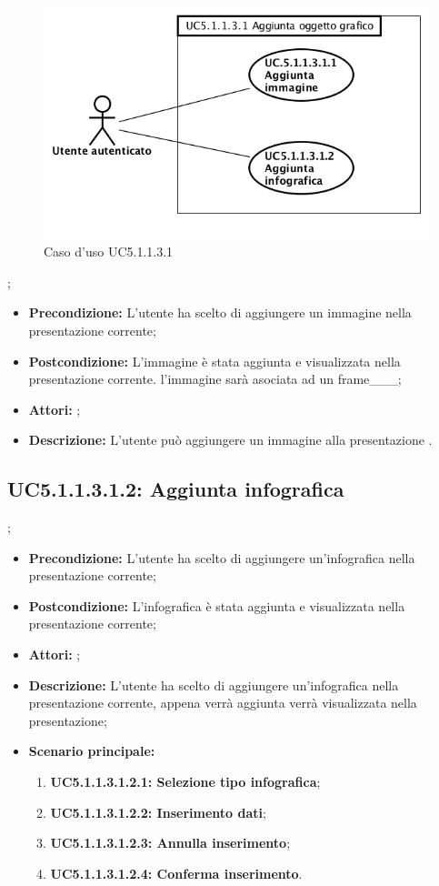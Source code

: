\begin{figure}[h]
	\begin{center}
	\includegraphics[scale=0.4]{diagram/UC5-1-1-3-1.png}
	\caption{Caso d'uso UC5.1.1.3.1}
	\end{center}
\end{figure};
\begin{itemize}
	\item \textbf{Precondizione:} L'utente ha scelto di aggiungere un immagine nella presentazione corrente;
	\item \textbf{Postcondizione:} L'immagine è stata aggiunta e visualizzata nella presentazione corrente. l'immagine sarà asociata ad un frame___;
	\item \textbf{Attori:} ;
	\item \textbf{Descrizione:} L'utente può aggiungere un immagine alla presentazione .
\end{itemize}
\subsection{ UC5.1.1.3.1.2: Aggiunta infografica}
;
\begin{itemize}
	\item \textbf{Precondizione:} L'utente ha scelto di aggiungere un'infografica  nella presentazione corrente;
	\item \textbf{Postcondizione:} L'infografica è stata aggiunta e visualizzata nella presentazione corrente;
	\item \textbf{Attori:} ;
	\item \textbf{Descrizione:} L'utente ha scelto di aggiungere un'infografica nella presentazione corrente, appena verrà aggiunta verrà visualizzata nella presentazione;
	\item \textbf{Scenario principale:}
	\begin{enumerate}
		\item \textbf{ UC5.1.1.3.1.2.1: Selezione tipo infografica};
		\item \textbf{ UC5.1.1.3.1.2.2: Inserimento dati};
		\item \textbf{ UC5.1.1.3.1.2.3: Annulla inserimento};
		\item \textbf{ UC5.1.1.3.1.2.4: Conferma inserimento}.
	\end{enumerate}
\end{itemize}
